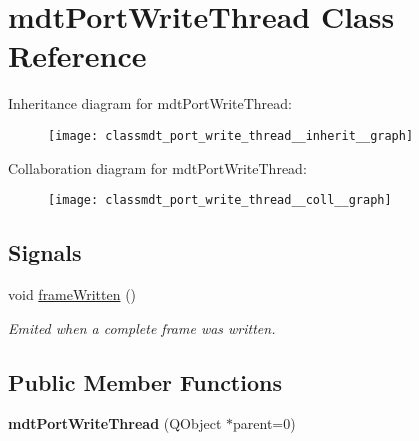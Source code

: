 \hypertarget{classmdt_port_write_thread}{
\section{mdtPortWriteThread Class Reference}
\label{classmdt_port_write_thread}
}


Inheritance diagram for mdtPortWriteThread:\nopagebreak
\begin{figure}[H]
\begin{center}
\leavevmode
\texttt{[image: classmdt\_port\_write\_thread\_\_inherit\_\_graph]}
\end{center}
\end{figure}


Collaboration diagram for mdtPortWriteThread:\nopagebreak
\begin{figure}[H]
\begin{center}
\leavevmode
\texttt{[image: classmdt\_port\_write\_thread\_\_coll\_\_graph]}
\end{center}
\end{figure}
\subsection*{Signals}
\begin{DoxyCompactItemize}
\item 
void \hyperlink{classmdt_port_write_thread_a8ea77f140d6d4f6fa731dbb80acf5da6}{frameWritten} ()
\begin{DoxyCompactList}\small\item\em Emited when a complete frame was written. \end{DoxyCompactList}\end{DoxyCompactItemize}
\subsection*{Public Member Functions}
\begin{DoxyCompactItemize}
\item 
\hypertarget{classmdt_port_write_thread_a994b96eafdd721ccff2f2410a5abd5e3}{
{\bfseries mdtPortWriteThread} (QObject $\ast$parent=0)}
\label{classmdt_port_write_thread_a994b96eafdd721ccff2f2410a5abd5e3}

\end{DoxyCompactItemize}


